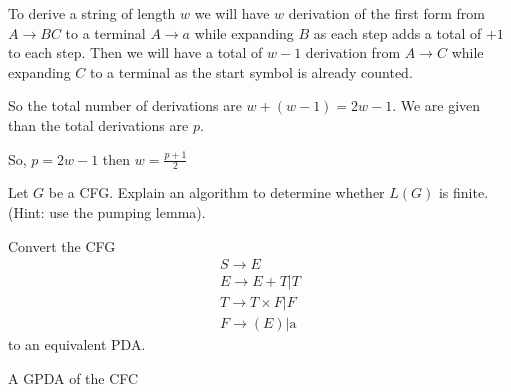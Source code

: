 \documentclass[12pt]{exam}
\begin{document}
\begin{questions}
\begin{solution}
    To derive a string of length $w$ we will have $w$ derivation of the first form from $A\to BC$ to a terminal $A\to a$ while expanding $B$ as each step adds a total of $+1$ to each step. Then we will have a total of $w-1$ derivation from $A\to C$ while expanding $C$ to a terminal as the start symbol is already counted.

    So the total number of derivations are $w + (w-1) = 2w-1$. We are given than the total derivations are $p$.

    So, $p = 2w-1$ then $w = \frac{p+1}{2}$


  \end{solution}

  \question{} Let $G$ be a CFG. Explain an algorithm to determine whether $L(G)$ is finite. (Hint: use the pumping lemma).

  \question{} Convert the CFG
  \begin{gather*}
  S\to E\\
    E\to E+T|T\\
    T\to T \times F|F\\
    F\to (E)|\text{a}
    \end{gather*}
  to an equivalent PDA.

  \begin{solution}

    A GPDA of the CFC



\end{solution}
\end{questions}
\end{document}
